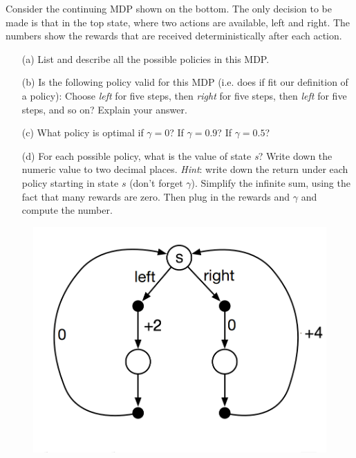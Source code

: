 Consider the continuing MDP shown on the bottom.
The only decision to be made is that in the top state, where two actions are available, left and right.
The numbers show the rewards that are received deterministically after each action.
\begin{itemize}
\item [(a)] List and describe all the possible policies in this MDP.
\item [(b)] Is the following policy valid for this MDP (i.e. does if fit our definition of a policy): Choose {\em left} for five steps, then {\em right} for five steps, then {\em left} for five steps, and so on? Explain your answer.
\item [(c)] What policy is optimal if $\gamma = 0$? If  $\gamma= 0.9$? If $\gamma = 0.5$?
\item [(d)] For each possible policy, what is the value of state {\em s}? Write down the numeric value to two decimal places. {\em Hint}: write down the return under each policy starting in state $s$ (don't forget $\gamma$). Simplify the infinite sum, using the fact that many rewards are zero. Then plug in the rewards and $\gamma$ and compute the number.
\end{itemize}

\begin{figure}[h!]
  \center
\includegraphics[width=0.6\linewidth]{figures/figure_3dot22.png}
\end{figure}
\bigspace